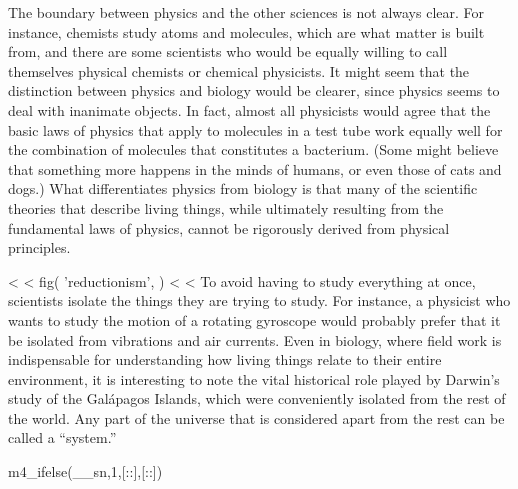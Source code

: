 The boundary between physics and the other sciences is not
always clear. For instance, chemists study atoms and
molecules, which are what matter is built from, and there
are some scientists who would be equally willing to call
themselves physical chemists or chemical physicists. It
might seem that the distinction between physics and biology
would be clearer, since physics seems to deal with inanimate
objects. In fact, almost all physicists would agree that the
basic laws of physics that apply to molecules in a test tube
work equally well for the combination of molecules that
constitutes a bacterium. (Some might believe that something
more happens in the minds of humans, or even those of cats
and dogs.) What differentiates physics from biology is that
many of the scientific theories that describe living things,
while ultimately resulting from the fundamental laws of
physics, cannot be rigorously derived from physical principles.

<%
<%
  fig(
    'reductionism',
  )
<%
<%
To avoid having to study everything at once, scientists
isolate the things they are trying to study. For instance, a
physicist who wants to study the motion of a rotating
gyroscope would probably prefer that it be isolated from
vibrations and air currents. Even in biology, where field
work is indispensable for understanding how living things
relate to their entire environment, it is interesting to
note the vital historical role played by Darwin's
study of the Gal\'{a}pagos Islands, which were conveniently
isolated from the rest of the world. Any part of the
universe that is considered apart from the rest can be
called a ``system.''

m4_ifelse(__sn,1,[::],[:\enlargethispage{-2\baselineskip}:])

